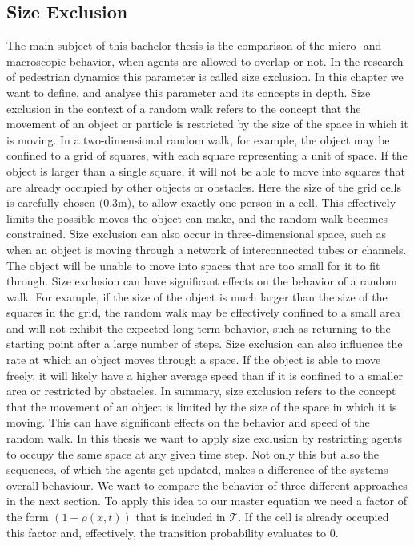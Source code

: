 \subsection{Size Exclusion}
The main subject of this bachelor thesis is the comparison of the micro- and macroscopic behavior, when agents are allowed to overlap or not.
In the research of pedestrian dynamics this parameter is called size exclusion. In this chapter we want to define, and analyse this parameter and its concepts in depth. 
Size exclusion in the context of a random walk refers to the concept that the movement of an object or particle is restricted by the size of the space in which it is moving.
In a two-dimensional random walk, for example, the object may be confined to a grid of squares, with each square representing a unit of space. 
If the object is larger than a single square, it will not be able to move into squares that are already occupied by other objects or obstacles. 
Here the size of the grid cells is carefully chosen (0.3m), to allow exactly one person in a cell. 
This effectively limits the possible moves the object can make, and the random walk becomes constrained.
Size exclusion can also occur in three-dimensional space, such as when an object is moving through a network of interconnected tubes or channels. 
The object will be unable to move into spaces that are too small for it to fit through.
Size exclusion can have significant effects on the behavior of a random walk. For example, if the size of the object is much larger than the size of the squares in the grid, 
the random walk may be effectively confined to a small area and will not exhibit the expected long-term behavior, such as returning to the starting point after a large number of steps.
Size exclusion can also influence the rate at which an object moves through a space. If the object is able to move freely, 
it will likely have a higher average speed than if it is confined to a smaller area or restricted by obstacles.
In summary, size exclusion refers to the concept that the movement of an object is limited by the size of the space in which it is moving. 
This can have significant effects on the behavior and speed of the random walk.
In this thesis we want to apply size exclusion by restricting agents to occupy the same space at any given time step.
Not only this but also the sequences, of which the agents get updated, makes a difference of the systems overall behaviour.
We want to compare the behavior of three different approaches in the next section.
To apply this idea to our master equation we need a factor of the form $ (1- \rho(x,t))$ that is included in $\mathcal{T}$.
If the cell is already occupied this factor and, effectively, the transition probability evaluates to 0. 

